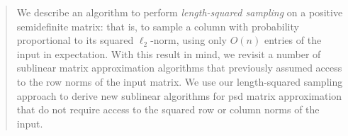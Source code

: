 \begin{abstract}
We describe an algorithm to perform \textit{length-squared sampling} on a positive semidefinite matrix: that is, to sample a column with probability proportional to its squared $\ell_2$-norm, using only $O(n)$ entries of the input in expectation. With this result in mind, we revisit a number of sublinear matrix approximation algorithms that previously assumed access to the row norms of the input matrix. We use our length-squared sampling approach to derive new sublinear algorithms for psd matrix approximation that do not require access to the squared row or column norms of the input.
\end{abstract}
